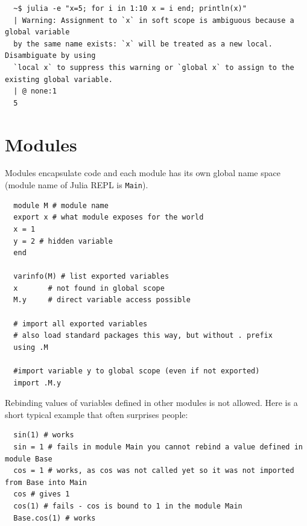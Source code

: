 \documentclass[10pt,a4paper]{article}
\begin{document}
\begin{lstlisting}
  ~$ julia -e "x=5; for i in 1:10 x = i end; println(x)"
  | Warning: Assignment to `x` in soft scope is ambiguous because a global variable
  by the same name exists: `x` will be treated as a new local. Disambiguate by using
  `local x` to suppress this warning or `global x` to assign to the existing global variable.
  | @ none:1
  5
\end{lstlisting}


\section{Modules}
Modules encapsulate code and each module has its own global name space (module
name of Julia REPL is \lstinline|Main|).
\begin{lstlisting}
  module M # module name
  export x # what module exposes for the world
  x = 1
  y = 2 # hidden variable
  end

  varinfo(M) # list exported variables
  x       # not found in global scope
  M.y     # direct variable access possible

  # import all exported variables
  # also load standard packages this way, but without . prefix
  using .M

  #import variable y to global scope (even if not exported)
  import .M.y
\end{lstlisting}
Rebinding values of variables defined in other modules is not allowed. Here is a
short typical example that often surprises people:
\begin{lstlisting}
  sin(1) # works
  sin = 1 # fails in module Main you cannot rebind a value defined in module Base
  cos = 1 # works, as cos was not called yet so it was not imported from Base into Main
  cos # gives 1
  cos(1) # fails - cos is bound to 1 in the module Main
  Base.cos(1) # works
\end{lstlisting}
\end{document}
